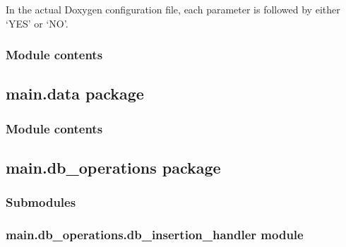 \documentclass[letterpaper,10pt,english]{sphinxmanual}
\begin{document}
\sphinxAtStartPar
In the actual Doxygen configuration file, each parameter is followed by either ‘YES’ or ‘NO’.


\subsubsection{Module contents}
\label{\detokenize{main.config:module-main.config}}\label{\detokenize{main.config:module-contents}}
\sphinxstepscope


\subsection{main.data package}
\label{\detokenize{main.data:main-data-package}}\label{\detokenize{main.data::doc}}

\subsubsection{Module contents}
\label{\detokenize{main.data:module-main.data}}\label{\detokenize{main.data:module-contents}}
\sphinxstepscope


\subsection{main.db\_operations package}
\label{\detokenize{main.db_operations:main-db-operations-package}}\label{\detokenize{main.db_operations::doc}}

\subsubsection{Submodules}
\label{\detokenize{main.db_operations:submodules}}

\subsubsection{main.db\_operations.db\_insertion\_handler module}
\label{\detokenize{main.db_operations:module-main.db_operations.db_insertion_handler}}\label{\detokenize{main.db_operations:main-db-operations-db-insertion-handler-module}}
\end{document}
